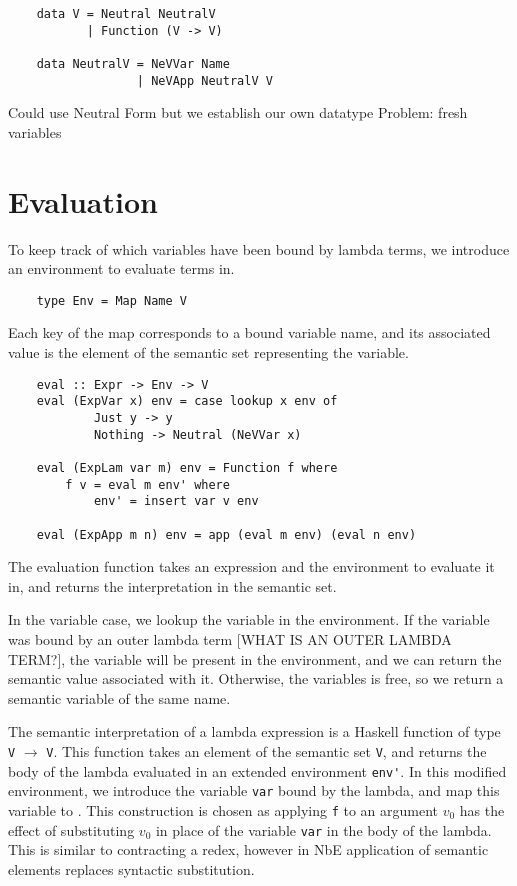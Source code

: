 \begin{lstlisting}
    data V = Neutral NeutralV
           | Function (V -> V)

    data NeutralV = NeVVar Name
                  | NeVApp NeutralV V
\end{lstlisting}

Could use Neutral Form but we establish our own datatype
Problem: fresh variables

\section{Evaluation}
To keep track of which variables have been bound by lambda terms, we introduce an environment to evaluate terms in.

\begin{lstlisting}
    type Env = Map Name V
\end{lstlisting}

Each key of the map corresponds to a bound variable name, and its associated value is the element of the semantic set representing the variable. 

\begin{lstlisting}
    eval :: Expr -> Env -> V
    eval (ExpVar x) env = case lookup x env of
            Just y -> y
            Nothing -> Neutral (NeVVar x)

    eval (ExpLam var m) env = Function f where
        f v = eval m env' where
            env' = insert var v env

    eval (ExpApp m n) env = app (eval m env) (eval n env)
\end{lstlisting}

The evaluation function takes an expression and the environment to evaluate it in, and returns the interpretation in the semantic set. 

In the variable case, we lookup the variable in the environment. If the variable was bound by an outer lambda term [WHAT IS AN OUTER LAMBDA TERM?], the variable will be present in the environment, and we can return the semantic value associated with it. Otherwise, the variables is free, so we return a semantic variable of the same name.

The semantic interpretation of a lambda expression is a Haskell function of type \lstinline{V} $\rightarrow$ \lstinline{V}. This function takes an element of the semantic set \lstinline{V}, and returns the body of the lambda evaluated in an extended environment \lstinline{env'}. In this modified environment, we introduce the variable \lstinline{var} bound by the lambda, and map this variable to . This construction is chosen as applying \lstinline{f} to an argument $v_0$ has the effect of substituting $v_0$ in place of the variable \lstinline{var} in the body of the lambda. This is similar to contracting a redex, however in NbE application of semantic elements replaces syntactic substitution.

